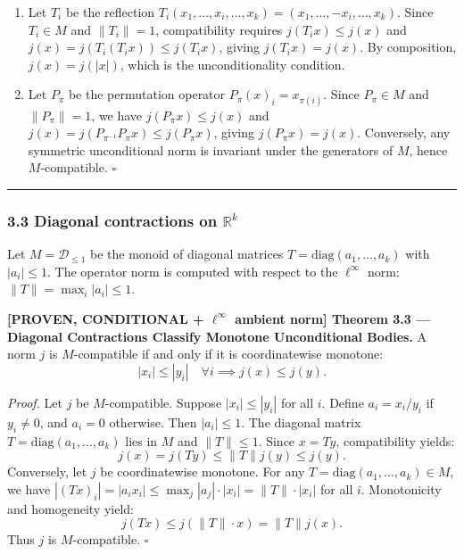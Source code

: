 \documentclass[
  11pt,
]{article}
\providecommand{\tightlist}{%
  \setlength{\itemsep}{0pt}\setlength{\parskip}{0pt}}
\providecommand{\tightlist}{%
  \setlength{\itemsep}{0pt}\setlength{\parskip}{0pt}}
\begin{document}
\begin{enumerate}
\def\labelenumi{\arabic{enumi}.}
\tightlist
\item
  Let \(T_i\) be the reflection \(T_i(x_1, \dots, x_i, \dots, x_k) = (x_1, \dots, -x_i, \dots, x_k)\). Since \(T_i \in M\) and \(\|T_i\| = 1\), compatibility requires \(j(T_i x) \leq j(x)\) and \(j(x) = j(T_i(T_i x)) \leq j(T_i x)\), giving \(j(T_i x) = j(x)\). By composition, \(j(x) = j(|x|)\), which is the unconditionality condition.
\item
  Let \(P_\pi\) be the permutation operator \(P_\pi(x)_i = x_{\pi(i)}\). Since \(P_\pi \in M\) and \(\|P_\pi\| = 1\), we have \(j(P_\pi x) \leq j(x)\) and \(j(x) = j(P_{\pi^{-1}} P_\pi x) \leq j(P_\pi x)\), giving \(j(P_\pi x) = j(x)\).
  Conversely, any symmetric unconditional norm is invariant under the generators of \(M\), hence \(M\)-compatible. \(\square\)
\end{enumerate}

\begin{center}\rule{0.5\linewidth}{0.5pt}\end{center}

\subsubsection{\texorpdfstring{3.3 Diagonal contractions on \(\mathbb{R}^k\)}{3.3 Diagonal contractions on \textbackslash mathbb\{R\}\^{}k}}\label{diagonal-contractions-on-mathbbrk}

Let \(M = \mathcal{D}_{\leq 1}\) be the monoid of diagonal matrices \(T = \mathrm{diag}(a_1, \dots, a_k)\) with \(|a_i| \leq 1\). The operator norm is computed with respect to the \(\ell^\infty\) norm: \(\|T\| = \max_i |a_i| \leq 1\).

\textbf{{[}PROVEN, CONDITIONAL + \(\ell^\infty\) ambient norm{]} Theorem 3.3 --- Diagonal Contractions Classify Monotone Unconditional Bodies.} A norm \(j\) is \(M\)-compatible if and only if it is coordinatewise monotone:
\[|x_i| \leq |y_i| \quad \forall i \implies j(x) \leq j(y).\]

\emph{Proof.} Let \(j\) be \(M\)-compatible. Suppose \(|x_i| \leq |y_i|\) for all \(i\). Define \(a_i = x_i / y_i\) if \(y_i \neq 0\), and \(a_i = 0\) otherwise. Then \(|a_i| \leq 1\). The diagonal matrix \(T = \mathrm{diag}(a_1, \dots, a_k)\) lies in \(M\) and \(\|T\| \leq 1\). Since \(x = T y\), compatibility yields:
\[j(x) = j(T y) \leq \|T\| j(y) \leq j(y).\]
Conversely, let \(j\) be coordinatewise monotone. For any \(T = \mathrm{diag}(a_1, \dots, a_k) \in M\), we have \(|(Tx)_i| = |a_i x_i| \leq \max_j |a_j| \cdot |x_i| = \|T\| \cdot |x_i|\) for all \(i\). Monotonicity and homogeneity yield:
\[j(T x) \leq j(\|T\| \cdot x) = \|T\| j(x).\]
Thus \(j\) is \(M\)-compatible. \(\square\)
\end{document}
